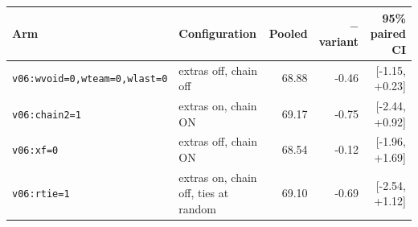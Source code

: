 \begin{tabular}{llrrr}
\toprule
Arm & Configuration & Pooled & \vsix{} $-$ variant & 95\% paired CI \\
\midrule
\texttt{v06:wvoid=0,wteam=0,wlast=0} & extras off, chain off & 68.88 & -0.46 & [-1.15, +0.23] \\
\texttt{v06:chain2=1} & extras on, chain ON & 69.17 & -0.75 & [-2.44, +0.92] \\
\texttt{v06:xf=0} & extras off, chain ON & 68.54 & -0.12 & [-1.96, +1.69] \\
\texttt{v06:rtie=1} & extras on, chain off, ties at random & 69.10 & -0.69 & [-2.54, +1.12] \\
\bottomrule
\end{tabular}
